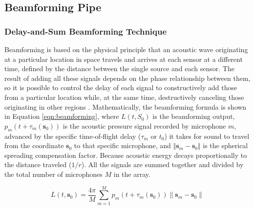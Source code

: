 \subsection{Beamforming Pipe}

\subsubsection{Delay-and-Sum Beamforming Technique}

Beamforming is based on the physical principle that an acoustic wave originating at a particular location in space travels and arrives at each sensor at a different time, defined by the distance between the single source and each sensor. The result of adding all these signals depends on the phase relationship between them, so it is possible to control the delay of each signal to constructively add those from a particular location while, at the same time, destructively canceling those originating in other regions \cite{BEA01}. Mathematically, the beamforming formula is shown in Equation \ref{eqn:beamforming}, where \(L(t,S_0)\) is the beamforming output, $p_m(t + \tau_m(\mathbf{s}_0))$ is the acoustic pressure signal recorded by microphone $m$, advanced by the specific time-of-flight delay ($\tau_m$ or $t_0$) it takes for sound to travel from the coordinate $\mathbf{s}_0$ to that specific microphone, and $\Vert{}\mathbf{s}_m - \mathbf{s}_0\Vert{}$ is the spherical spreading compensation factor. Because acoustic energy decays proportionally to the distance traveled ($1/r$). All the signals are summed together and divided by the total number of microphones \(M\) in the array.

\begin{equation}
\label{eqn:beamforming}
L(t, \mathbf{s}_0) = \frac{4\pi}{M} \sum_{m=1}^{M} p_m(t + \tau_m(\mathbf{s}_0)) \|\mathbf{s}_m - \mathbf{s}_0\|
\end{equation}


